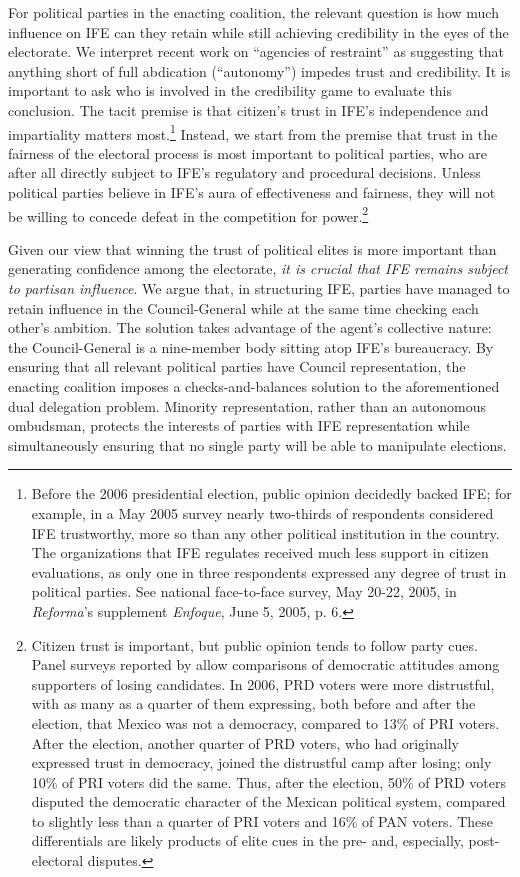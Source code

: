 \documentclass[12 pt, letter]{article}
\begin{document}
For political parties in the enacting coalition, the relevant question is how much influence on IFE can they retain while still achieving credibility in the eyes of the electorate.  We interpret recent work on ``agencies of restraint'' \citep{Schedler1999, Eisenstadt2004} as suggesting that anything short of full abdication (``autonomy'') impedes trust and credibility.  It is important to ask who is involved in the credibility game to evaluate this conclusion.  The tacit premise is that citizen's trust in IFE's independence and impartiality matters most.\footnote{Before the 2006 presidential election, public opinion decidedly backed IFE; for example, in a May 2005 survey nearly two-thirds of respondents considered IFE trustworthy, more so than any other political institution in the country.  The organizations that IFE regulates received much less support in citizen evaluations, as only one in three respondents expressed any degree of trust in political parties.  See national face-to-face survey, May 20-22, 2005, in \emph{Reforma}'s supplement \emph{Enfoque}, June 5, 2005, p. 6.} Instead, we start from the premise that trust in the fairness of the electoral process is most important to political parties, who are after all directly subject to IFE's regulatory and procedural decisions.  Unless political parties believe in IFE's aura of effectiveness and fairness, they will not be willing to concede defeat in the competition for power.\footnote{Citizen trust is important, but public opinion tends to follow party cues.  Panel surveys reported by \citet{Estrada2007} allow comparisons of democratic attitudes among supporters of losing candidates. In 2006, PRD voters were more distrustful, with as many as a quarter of them expressing, both before and after the election, that Mexico was not a democracy, compared to 13\% of PRI voters. After the election, another quarter of PRD voters, who had originally expressed  trust in democracy, joined the distrustful camp after losing; only 10\% of PRI voters did the same. Thus, after the election, 50\% of PRD voters disputed the democratic character of the Mexican political system, compared to slightly less than a quarter of PRI voters and 16\% of PAN voters.  These differentials are likely products of elite cues in the pre- and, especially, post-electoral disputes.}

Given our view that winning the trust of political elites is more important than generating confidence among the electorate, \emph{it is crucial that IFE remains subject to partisan influence}. We argue that, in structuring IFE, parties have managed to retain influence in the Council-General while at the same time checking each other's ambition.  The solution takes advantage of the agent's collective nature: the Council-General is a nine-member body sitting atop IFE's bureaucracy.  By ensuring that all relevant political parties have Council representation, the enacting coalition imposes a checks-and-balances solution to the aforementioned dual delegation problem. Minority representation, rather than an autonomous ombudsman, protects the interests of parties with IFE representation while simultaneously ensuring that no single party will be able to manipulate elections.
\end{document}
